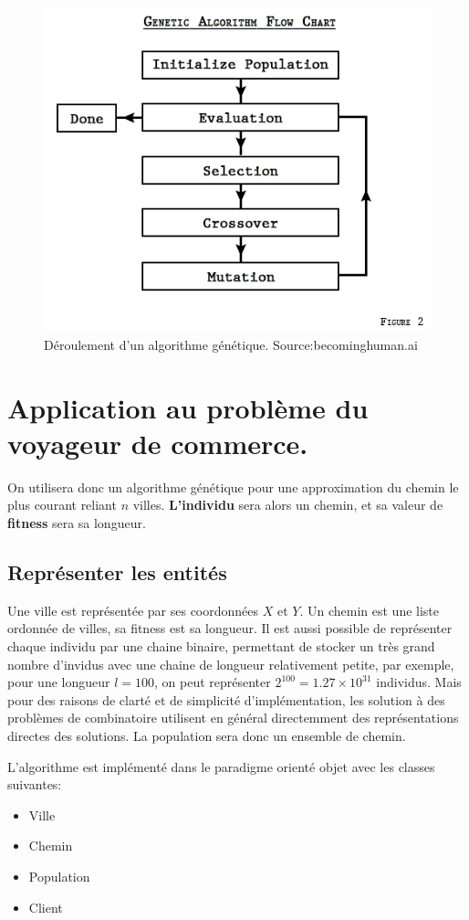 \documentclass[11pt]{article}
\begin{document}
\begin{figure}[htb]
\centering
\includegraphics[width=.6\linewidth]{./GA.png}
\caption{Déroulement d'un algorithme génétique. Source:becominghuman.ai}
\end{figure}

\section{Application au problème du voyageur de commerce.}
\label{sec-2}

On utilisera donc un algorithme génétique pour une approximation du chemin le plus courant reliant $n$ villes.
\textbf{L'individu} sera alors un chemin, et sa valeur de \textbf{fitness} sera sa longueur.   

\subsection{Représenter les entités}
\label{sec-2-1}

Une ville est représentée par ses coordonnées $X$ et $Y$.
Un chemin est une liste ordonnée de villes, sa fitness est sa longueur. Il est aussi possible de représenter chaque individu par une chaine
binaire, permettant de stocker un très grand nombre d'invidus avec une chaine de longueur relativement petite, par exemple, pour une longueur
$l = 100$, on peut représenter $2^{100} = 1.27 \times 10^{31}$ individus. Mais pour des raisons de clarté et de simplicité d'implémentation,
les solution à des problèmes de combinatoire utilisent en général directemment des représentations directes des solutions.
La population sera donc un ensemble de chemin.

L'algorithme est implémenté dans le paradigme orienté objet avec les classes suivantes:
\begin{itemize}
\item Ville
\item Chemin
\item Population
\item Client
\end{itemize}
\end{document}
